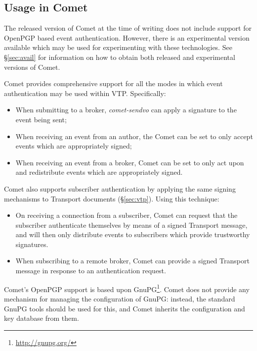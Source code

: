 \documentclass[5p,authoryear]{elsarticle}
\begin{document}
\subsection{Usage in Comet}

The released version of Comet at the time of writing does not include support
for OpenPGP based event authentication. However, there is an experimental
version available which may be used for experimenting with these technologies.
See \S\ref{sec:avail} for information on how to obtain both released and
experimental versions of Comet.

Comet provides comprehensive support for all the modes in which event
authentication may be used within VTP\@. Specifically:

\begin{itemize}

  \item{When submitting to a broker, \textit{comet-sendvo} can apply a
  signature to the event being sent;}

  \item{When receiving an event from an author, the Comet can be set to
  only accept events which are appropriately signed;}

  \item{When receiving an event from a broker, Comet can be set to only act
  upon and redistribute events which are appropriately signed.}

\end{itemize}

Comet also supports subscriber authentication by applying the same signing
mechanisms to Transport documents (\S\ref{sec:vtp}). Using this technique:

\begin{itemize}

  \item{On receiving a connection from a subscriber, Comet can request that
  the subscriber authenticate themselves by means of a signed Transport
  message, and will then only distribute events to subscribers which provide
  trustworthy signatures.}

  \item{When subscribing to a remote broker, Comet can provide a signed
  Transport message in response to an authentication request.}

\end{itemize}


Comet's OpenPGP support is based upon GnuPG\footnote{\url{http://gnupg.org/}}.
Comet does not provide any mechanism for managing the configuration of GnuPG:
instead, the standard GnuPG tools should be used for this, and Comet inherits
the configuration and key database from them.
\end{document}
